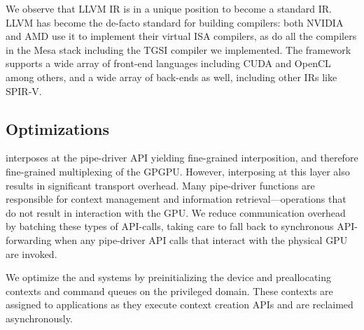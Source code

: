 We observe that LLVM IR is in a unique position to become a standard IR.
LLVM has become the de-facto standard for building compilers: both NVIDIA and
AMD use it to implement their virtual ISA compilers, as do all the compilers
in the Mesa stack including the TGSI compiler we implemented. The framework
supports a wide array of front-end languages including CUDA and OpenCL among
others, and a wide array of back-ends as well, including other IRs like SPIR-V.

\subsection{Optimizations}
\label{sec:optimizations}
\Trillium interposes at the pipe-driver API yielding fine-grained
interposition, and therefore fine-grained multiplexing of the GPGPU.
However, interposing at this layer also results in significant transport
overhead. Many pipe-driver functions are responsible for context management
and information retrieval---operations that do not result in interaction with
the GPU. We reduce communication overhead by batching these types of
API-calls, taking care to fall back to synchronous API-forwarding when any
pipe-driver API calls that interact with the physical GPU are invoked.

We optimize the \apigpu and \apicpu systems by preinitializing the device and
preallocating contexts and command queues on the privileged domain. These
contexts are assigned to applications as they execute context creation APIs
and are reclaimed asynchronously.